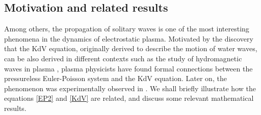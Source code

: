 \documentclass{amsart}
\numberwithin{equation}{section}
\theoremstyle{plain}%
\theoremstyle{definition}
\theoremstyle{remark}
\theoremstyle{remark}
\begin{document}
\subsection{Motivation and related results}

Among others, the propagation of solitary waves is one of the most interesting phenomena in the dynamics of electrostatic plasma. Motivated by the discovery that the KdV equation, originally derived to describe the motion of water waves, can be also derived in different contexts such as the study of hydromagnetic waves in plasma \cite{Gar}, plasma physicists have found formal connections \cite{Sag,Wa} between the pressureless Euler-Poisson system and the KdV equation. Later on, the phenomenon was experimentally observed in \cite{ikezi}.
We shall briefly illustrate how the equations \eqref{EP2} and \eqref{KdV} are related, and discuss some relevant mathematical results.



\end{document}
